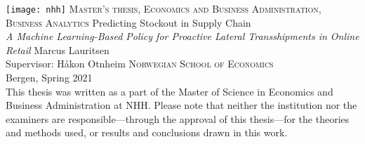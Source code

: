 \documentclass[../../main.tex]{subfiles}
\begin{document}
\begin{titlepage}
    \centering
    \texttt{[image: nhh]}
    \vfill
    \large{\textsc{Master's thesis, Economics and Business Administration, Business Analytics}}    
    \vfill
    \Huge{Predicting Stockout in Supply Chain}
    \\         
	\vspace{16pt}
    \large{\textit{A Machine Learning-Based Policy for Proactive Lateral Transshipments in Online Retail}}
    \vfill        
    \large{Marcus Lauritsen \\
    Supervisor: Håkon Otnheim}
    \vfill
    \vfill
    \normalsize
    \textsc{Norwegian School of Economics} \\
	Bergen, Spring 2021 \\
	\vspace{16pt}
    This thesis was written as a part of the Master of Science in Economics and Business Administration at NHH. Please note that neither the institution nor the examiners are responsible---through the approval of this thesis---for the theories and methods used, or results and conclusions drawn in this work.
\end{titlepage}
\end{document}
